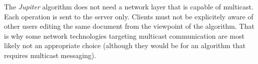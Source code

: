 The \emph{Jupiter} algorithm does not need a network layer that is capable of multicast. Each operation is sent to the server only. Clients must not be explicitely aware of other users editing the same document from the viewpoint of the algorithm. That is why some network technologies targeting multicast communication are most likely not an appropriate choice (although they would be for an algorithm that requires multicast messaging).

